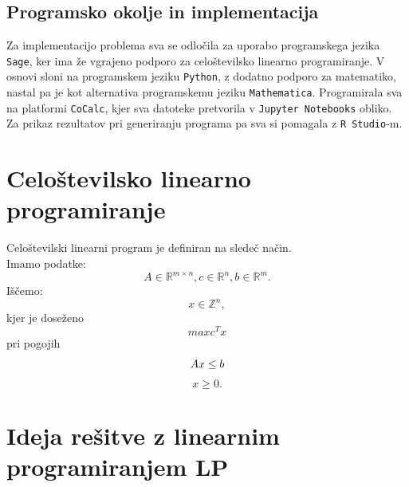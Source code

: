 \documentclass[11pt]{article}
\theoremstyle{definition}
\newcommand{\1}{\mathbbm{1}}
\begin{document}
\subsection{Programsko okolje in implementacija}
\vspace{0.5cm}

Za implementacijo problema sva se odločila za uporabo programskega jezika \texttt{Sage}, ker ima že vgrajeno podporo za celoštevilsko linearno programiranje. V osnovi sloni na programskem jeziku \texttt{Python}, z dodatno podporo za matematiko, nastal pa je kot alternativa programskemu jeziku \texttt{Mathematica}. Programirala sva na platformi \texttt{CoCalc}, kjer sva datoteke pretvorila v \texttt{Jupyter Notebooks} obliko. \\
Za prikaz rezultatov pri generiranju programa pa sva si pomagala z \texttt{R Studio}-m.

\section{Celoštevilsko linearno programiranje}
\vspace{0.5cm}

Celoštevilski linearni program je definiran na sledeč način. \\
Imamo podatke:
$$A \in \mathbb{R}^{m \times n}, c \in  \mathbb{R}^{n}, b \in  \mathbb{R}^{m }. $$ Iščemo: $$x \in  \mathbb{Z}^{n},$$kjer je doseženo$$maxc^Tx$$
pri pogojih $$Ax\le b\\$$ $$x \ge 0.$$



\section{Ideja rešitve z linearnim programiranjem LP}
\vspace{0.5cm}
\end{document}
